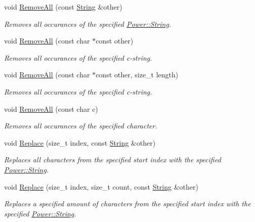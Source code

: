\begin{DoxyCompactItemize}
void \hyperlink{class_power_1_1_string_a0189bdb52b19b0f9e7929cb87b2fd66c}{Remove\+All} (const \hyperlink{class_power_1_1_string}{String} \&other)
\begin{DoxyCompactList}\small\item\em Removes all occurances of the specified \hyperlink{class_power_1_1_string}{Power\+::\+String}. \end{DoxyCompactList}\item 
void \hyperlink{class_power_1_1_string_a1b237c81ea2a466c192cdd63e706f455}{Remove\+All} (const char $\ast$const other)
\begin{DoxyCompactList}\small\item\em Removes all occurances of the specified c-\/string. \end{DoxyCompactList}\item 
void \hyperlink{class_power_1_1_string_a6418c5e3a28ef177a3516c17be3bfcb3}{Remove\+All} (const char $\ast$const other, size\+\_\+t length)
\begin{DoxyCompactList}\small\item\em Removes all occurances of the specified c-\/string. \end{DoxyCompactList}\item 
void \hyperlink{class_power_1_1_string_ac1a456c7f0f019263c424431b0fbeefa}{Remove\+All} (const char c)
\begin{DoxyCompactList}\small\item\em Removes all occurances of the specified character. \end{DoxyCompactList}\item 
void \hyperlink{class_power_1_1_string_a8fc1e2630c8ce27765589c7cf8cce1d7}{Replace} (size\+\_\+t index, const \hyperlink{class_power_1_1_string}{String} \&other)
\begin{DoxyCompactList}\small\item\em Replaces all characters from the specified start index with the specified \hyperlink{class_power_1_1_string}{Power\+::\+String}. \end{DoxyCompactList}\item 
void \hyperlink{class_power_1_1_string_a2c8234083a3b5b44387ba9712dd85344}{Replace} (size\+\_\+t index, size\+\_\+t count, const \hyperlink{class_power_1_1_string}{String} \&other)
\begin{DoxyCompactList}\small\item\em Replaces a specified amount of characters from the specified start index with the specified \hyperlink{class_power_1_1_string}{Power\+::\+String}. \end{DoxyCompactList}\item 

\end{DoxyCompactItemize}
